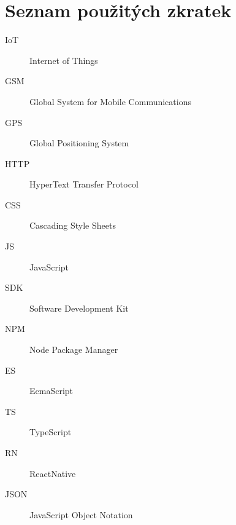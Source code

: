 \chapter*{Seznam použitých zkratek}

\begin{multicols}{2}
\raggedright
\begin{description}
\item [IoT] Internet of Things
\item [GSM] Global System for Mobile Communications
\item [GPS] Global Positioning System
\item [HTTP] HyperText Transfer Protocol
\item[CSS] Cascading Style Sheets
\item [JS] JavaScript
\item [SDK] Software Development Kit
\item [NPM] Node Package Manager
\item [ES] EcmaScript
\item [TS] TypeScript
\item [RN] ReactNative
\item [JSON] JavaScript Object Notation
\end{description}
\end{multicols}

